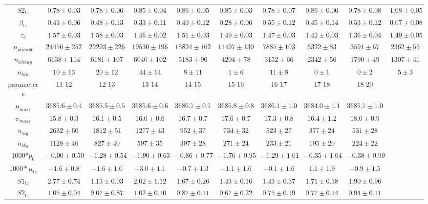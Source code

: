 \begin{sidewaystable}[h]
\begin{center}
{\begin{tabular}{c|ccccccccc}
$S2_{tz}$  & $0.78\pm0.03$ & $0.78\pm0.06$ & $0.85\pm0.04$ & $0.86\pm0.05$ & $0.85\pm0.03$ & $0.78\pm0.07$ & $0.86\pm0.06$ & $0.78\pm0.08$ & $1.08\pm0.05$\\
$\beta_{tz}$  & $0.43\pm0.06$ & $0.48\pm0.13$ & $0.33\pm0.11$ & $0.40\pm0.12$ & $0.28\pm0.06$ & $0.55\pm0.12$ & $0.45\pm0.14$ & $0.53\pm0.12$ & $0.07\pm0.08$\\
$\tau_{b}$  & $1.57\pm0.03$ & $1.58\pm0.03$ & $1.46\pm0.02$ & $1.51\pm0.03$ & $1.49\pm0.03$ & $1.47\pm0.03$ & $1.42\pm0.03$ & $1.36\pm0.04$ & $1.49\pm0.05$\\
$n_{prompt}$  & $24456\pm252$ & $22293\pm226$ & $19530\pm196$ & $15894\pm162$ & $11497\pm130$ & $7885\pm103$ & $5322\pm83$ & $3591\pm67$ & $2362\pm55$\\
$n_{bdecay}$  & $6138\pm114$ & $6181\pm107$ & $6040\pm102$ & $5183\pm90$ & $4204\pm78$ & $3152\pm66$ & $2342\pm56$ & $1790\pm49$ & $1307\pm41$\\
$n_{tail}$  & $10\pm13$ & $20\pm12$ & $44\pm14$ & $8\pm11$ & $1\pm6$ & $11\pm8$ & $0\pm1$ & $0\pm2$ & $5\pm3$\\
\hline
parameters & 11-12 & 12-13 & 13-14  &  14-15 & 15-16 & 16-17 & 17-18 & 18-20 \\ \hline
$\mu_{mass}$  & $3685.6\pm0.4$ & $3685.5\pm0.5$ & $3685.6\pm0.6$ & $3686.7\pm0.7$ & $3685.8\pm0.8$ & $3686.1\pm1.0$ & $3684.0\pm1.1$ & $3685.7\pm1.0$\\
$\sigma_{mass}$  & $15.8\pm0.3$ & $16.1\pm0.5$ & $16.0\pm0.6$ & $16.7\pm0.7$ & $17.6\pm0.7$ & $17.3\pm0.8$ & $16.4\pm1.2$ & $18.0\pm0.9$\\
$n_{sig}$  & $2632\pm60$ & $1812\pm51$ & $1277\pm43$ & $952\pm37$ & $734\pm32$ & $523\pm27$ & $377\pm24$ & $531\pm28$\\
$n_{bkg}$  & $1128\pm46$ & $827\pm40$ & $597\pm35$ & $397\pm28$ & $271\pm24$ & $233\pm21$ & $195\pm20$ & $224\pm22$\\
1000*$p_{0}$  & $-0.00\pm0.50$ & $-1.28\pm0.54$ & $-1.90\pm0.63$ & $-0.86\pm0.77$ & $-1.76\pm0.95$ & $-1.29\pm1.01$ & $-0.35\pm1.04$ & $-0.38\pm0.99$\\
$1000*\mu_{tz}$  & $-1.6\pm0.8$ & $-1.6\pm1.0$ & $-3.0\pm1.1$ & $-0.7\pm1.3$ & $-1.1\pm1.6$ & $-0.1\pm1.6$ & $1.1\pm1.9$ & $-0.9\pm1.5$\\
$S1_{tz}$  & $2.77\pm0.74$ & $1.13\pm0.03$ & $2.02\pm1.12$ & $1.67\pm0.26$ & $1.43\pm0.16$ & $1.43\pm0.37$ & $1.71\pm0.38$ & $1.90\pm0.96$\\
$S2_{tz}$  & $1.05\pm0.04$ & $9.07\pm0.87$ & $1.02\pm0.10$ & $0.87\pm0.11$ & $0.67\pm0.22$ & $0.75\pm0.19$ & $0.77\pm0.14$ & $0.94\pm0.11$\\

\end{tabular}}
\end{center}
\end{sidewaystable}
